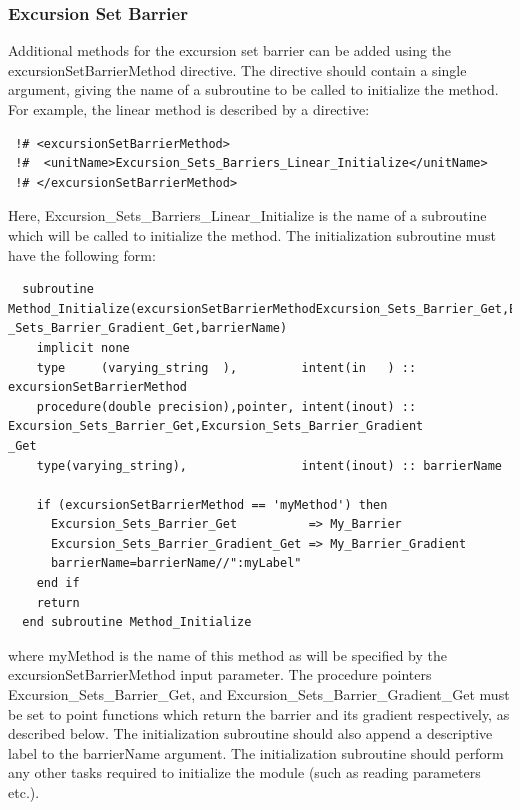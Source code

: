 \subsubsection{Excursion Set Barrier}\label{sec:excursionSetBarrierMethod}

Additional methods for the excursion set barrier can be added using the {\normalfont \ttfamily excursionSetBarrierMethod} directive. The directive should contain a single argument, giving the name of a subroutine to be called to initialize the method. For example, the {\normalfont \ttfamily linear} method is described by a directive:
\begin{verbatim}
 !# <excursionSetBarrierMethod>
 !#  <unitName>Excursion_Sets_Barriers_Linear_Initialize</unitName>
 !# </excursionSetBarrierMethod>
\end{verbatim}
Here, {\normalfont \ttfamily Excursion\_Sets\_Barriers\_Linear\_Initialize} is the name of a subroutine which will be called to initialize the method. The initialization subroutine must have the following form:
\begin{verbatim}
  subroutine Method_Initialize(excursionSetBarrierMethodExcursion_Sets_Barrier_Get,Excursion
_Sets_Barrier_Gradient_Get,barrierName)
    implicit none
    type     (varying_string  ),         intent(in   ) :: excursionSetBarrierMethod
    procedure(double precision),pointer, intent(inout) :: Excursion_Sets_Barrier_Get,Excursion_Sets_Barrier_Gradient
_Get
    type(varying_string),                intent(inout) :: barrierName

    if (excursionSetBarrierMethod == 'myMethod') then
      Excursion_Sets_Barrier_Get          => My_Barrier
      Excursion_Sets_Barrier_Gradient_Get => My_Barrier_Gradient
      barrierName=barrierName//":myLabel"
    end if
    return
  end subroutine Method_Initialize
\end{verbatim}
where {\normalfont \ttfamily myMethod} is the name of this method as will be specified by the {\normalfont \ttfamily excursionSetBarrierMethod} input parameter. The procedure pointers {\normalfont \ttfamily Excursion\_Sets\_Barrier\_Get}, and {\normalfont \ttfamily Excursion\_Sets\_Barrier\_Gradient\_Get} must be set to point functions which return the barrier and its gradient respectively, as described below. The initialization subroutine should also append a descriptive label to the {\normalfont \ttfamily barrierName} argument. The initialization subroutine should perform any other tasks required to initialize the module (such as reading parameters etc.).


